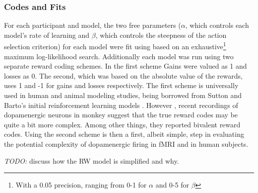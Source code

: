 \documentclass[doc,12pt]{apa}        %
\begin{document}
\subsubsection{Codes and Fits}
\label{subsub:codesandfits}
For each participant and model, the two free parameters ($\alpha$, which controls each model's rate of learning and $\beta$, which controls the steepness of the action selection criterion) for each model were fit using based on an exhaustive\footnote{With a 0.05 precision, ranging from 0-1 for $\alpha$ and 0-5 for $\beta$} maximum log-likelihood search.  Additionally each model was run using two separate reward coding schemes.  In the first scheme Gains were valued as 1 and losses as 0.  The second, which was based on the absolute value of the rewards, uses 1 and -1 for gains and losses respectively.  The first scheme is universally used in human and animal modeling studies, being borrowed from Sutton and Barto's initial reinforcement learning models \cite{Sutton:1998p9247}.  However , recent recordings of dopamenergic neurons in monkey suggest that the true reward codes may be quite a bit more complex.  Among other things, they reported bivalent reward codes.  Using the second scheme is then a first, albeit simple, step in evaluating the potential complexity of dopamenergic firing in fMRI and in human subjects.

\emph{TODO:} discuss how the RW model is simplified and why.
\end{document}
